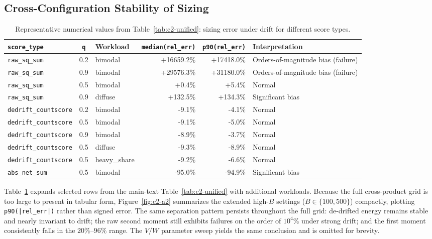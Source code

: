 \subsection{Cross-Configuration Stability of Sizing}

\begin{table}[!thbp]
\centering
\small
\setlength{\tabcolsep}{4pt}
\begin{tabular}{@{}lclrrp{}@{}}
\toprule
\texttt{score\_type} & \texttt{q} & Workload & \texttt{median(rel\_err)} & \texttt{p90(rel\_err)} & Interpretation \\
\midrule
\texttt{raw\_sq\_sum} & 0.2 & bimodal & +16659.2\% & +17418.0\% & Orders-of-magnitude bias (failure) \\
\texttt{raw\_sq\_sum} & 0.9 & bimodal & +29576.3\% & +31180.0\% & Orders-of-magnitude bias (failure) \\
\texttt{raw\_sq\_sum} & 0.5 & bimodal & +0.4\% & +5.4\% & Normal \\
\texttt{raw\_sq\_sum} & 0.9 & diffuse & +132.5\% & +134.3\% & Significant bias \\
\texttt{dedrift\_countscore} & 0.2 & bimodal & -9.1\% & -4.1\% & Normal \\
\texttt{dedrift\_countscore} & 0.5 & bimodal & -9.1\% & -5.0\% & Normal \\
\texttt{dedrift\_countscore} & 0.9 & bimodal & -8.9\% & -3.7\% & Normal \\
\texttt{dedrift\_countscore} & 0.5 & diffuse & -9.3\% & -8.9\% & Normal \\
\texttt{dedrift\_countscore} & 0.5 & heavy\_share & -9.2\% & -6.6\% & Normal \\
\texttt{abs\_net\_sum} & 0.5 & bimodal & -95.0\% & -94.9\% & Significant bias \\
\bottomrule
\end{tabular}
\caption{Representative numerical values from Table~\ref{tab:c2-unified}: sizing error under drift for different score types.}
\label{tab:c2-2}
\end{table}

Table~\ref{tab:c2-2} expands selected rows from the main-text Table~\ref{tab:c2-unified} with additional workloads. Because the full cross-product grid is too large to present in tabular form, Figure~\ref{fig:c2-a2} summarizes the extended high-$B$ settings ($B \in \{100, 500\}$) compactly, plotting \texttt{p90(|rel\_err|)} rather than signed error. The same separation pattern persists throughout the full grid: de-drifted energy remains stable and nearly invariant to drift; the raw second moment still exhibits failures on the order of $10^4\%$ under strong drift; and the first moment consistently falls in the $20\%$--$96\%$ range. The $V/W$ parameter sweep yields the same conclusion and is omitted for brevity.


